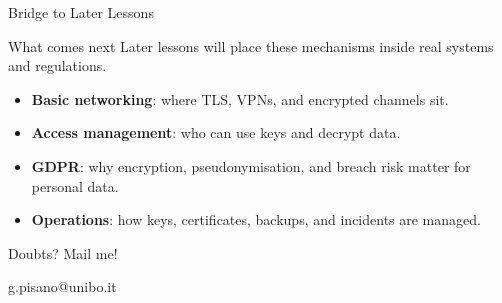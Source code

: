 \documentclass[presentation]{beamer}
\begin{document}
\begin{frame}[c]{Bridge to Later Lessons}
\begin{block}{What comes next}
Later lessons will place these mechanisms inside real systems and regulations.
\end{block}

\begin{itemize}
    \item \textbf{Basic networking}: where TLS, VPNs, and encrypted channels sit.
    \item \textbf{Access management}: who can use keys and decrypt data.
    \item \textbf{GDPR}: why encryption, pseudonymisation, and breach risk matter for personal data.
    \item \textbf{Operations}: how keys, certificates, backups, and incidents are managed.
\end{itemize}
\end{frame}

\begin{frame}[c]{Doubts? Mail me!}
\begin{center}
\Large g.pisano@unibo.it
\end{center}
\end{frame}

\begin{frame}[allowframebreaks]
\titlepage
\end{frame}

\section*{\refname}

\begin{frame}{\refname}
	\scriptsize
	
	
\end{frame}
\end{document}
